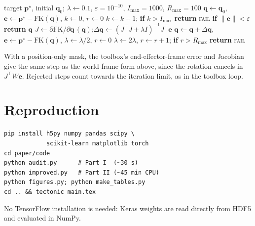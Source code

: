 \documentclass[conference]{IEEEtran}
\newcommand{\p}{\mathbf{p}}
\newcommand{\q}{\mathbf{q}}
\newcommand{\FK}{\mathrm{FK}}
\newcommand{\code}[1]{\texttt{#1}}
\begin{document}
\begin{algorithm}[t]
\caption{Position-only LM IK (replica of RTB \code{SerialLink.ikine} as used)}
\label{alg:lm}
\begin{algorithmic}[1]
\Require target $\p^\star$, initial $\q_0$; $\lambda\gets0.1$, $\varepsilon=10^{-10}$, $I_{\max}=1000$, $R_{\max}=100$
\State $\q\gets\q_0$, $\mathbf e\gets\p^\star-\FK(\q)$, $k\gets0$, $r\gets0$
\Loop
  \State $k\gets k+1$; \textbf{if} $k>I_{\max}$ \textbf{return} \textsc{fail}
  \State \textbf{if} $\|\mathbf e\|<\varepsilon$ \textbf{return} $\q$
  \State $J\gets\partial\FK/\partial\q\,(\q)$;\quad $\Delta\q\gets(J^\top J+\lambda I)^{-1}J^\top\mathbf e$
  \If{$\|\p^\star-\FK(\q+\Delta\q)\|<\|\mathbf e\|$}
     \State $\q\gets\q+\Delta\q$, $\mathbf e\gets\p^\star-\FK(\q)$, $\lambda\gets\lambda/2$, $r\gets0$
  \Else
     \State $\lambda\gets2\lambda$, $r\gets r+1$; \textbf{if} $r>R_{\max}$ \textbf{return} \textsc{fail}
  \EndIf
\EndLoop
\end{algorithmic}
\end{algorithm}

With a position-only mask, the toolbox's end-effector-frame error and Jacobian give the same step as the world-frame form above, since the rotation cancels in $J^\top W\mathbf e$. Rejected steps count towards the iteration limit, as in the toolbox loop.

\section{Reproduction}
\label{app:repro}

{\footnotesize
\begin{verbatim}
pip install h5py numpy pandas scipy \
            scikit-learn matplotlib torch
cd paper/code
python audit.py      # Part I  (~30 s)
python improved.py   # Part II (~45 min CPU)
python figures.py; python make_tables.py
cd .. && tectonic main.tex
\end{verbatim}}
No TensorFlow installation is needed: Keras weights are read directly from HDF5 and evaluated in NumPy.
\end{document}
